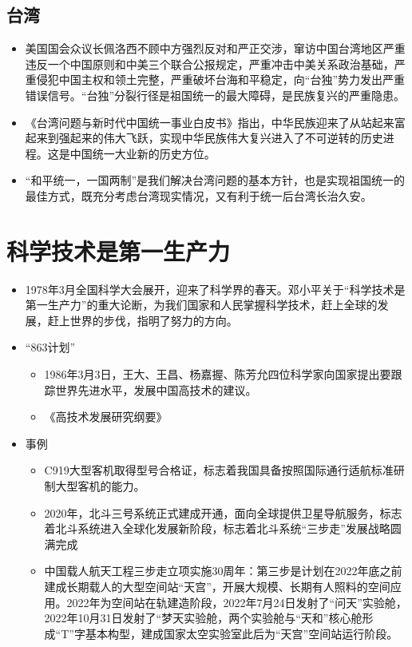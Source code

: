 \documentclass[
]{ctexart}
\providecommand{\tightlist}{%
  \setlength{\itemsep}{0pt}\setlength{\parskip}{0pt}}
\begin{document}
\hypertarget{ux53f0ux6e7e}{%
\subsection{台湾}\label{ux53f0ux6e7e}}

\begin{itemize}
\tightlist
\item
  美国国会众议长佩洛西不顾中方强烈反对和严正交涉，窜访中国台湾地区严重违反一个中国原则和中美三个联合公报规定，严重冲击中美关系政治基础，严重侵犯中国主权和领土完整，严重破坏台海和平稳定，向``台独''势力发出严重错误信号。``台独''分裂行径是祖国统一的最大障碍，是民族复兴的严重隐患。
\item
  《台湾问题与新时代中国统一事业白皮书》指出，中华民族迎来了从站起来富起来到强起来的伟大飞跃，实现中华民族伟大复兴进入了不可逆转的历史进程。这是中国统一大业新的历史方位。
\item
  ``和平统一，一国两制''是我们解决台湾问题的基本方针，也是实现祖国统一的最佳方式，既充分考虑台湾现实情况，又有利于统一后台湾长治久安。
\end{itemize}

\hypertarget{ux79d1ux5b66ux6280ux672fux662fux7b2cux4e00ux751fux4ea7ux529b}{%
\section{科学技术是第一生产力}\label{ux79d1ux5b66ux6280ux672fux662fux7b2cux4e00ux751fux4ea7ux529b}}

\begin{itemize}
\tightlist
\item
  1978年3月全国科学大会展开，迎来了科学界的春天。邓小平关于``科学技术是第一生产力''的重大论断，为我们国家和人民掌握科学技术，赶上全球的发展，赶上世界的步伐，指明了努力的方向。
\item
  ``863计划''

  \begin{itemize}
  \tightlist
  \item
    1986年3月3日，王大、王昌、杨嘉握、陈芳允四位科学家向国家提出要跟踪世界先进水平，发展中国高技术的建议。
  \item
    《高技术发展研究纲要》
  \end{itemize}
\item
  事例

  \begin{itemize}
  \tightlist
  \item
    C919大型客机取得型号合格证，标志着我国具备按照国际通行适航标准研制大型客机的能力。
  \item
    2020年，北斗三号系统正式建成开通，面向全球提供卫星导航服务，标志着北斗系统进入全球化发展新阶段，标志着北斗系统``三步走''发展战略圆满完成
  \item
    中国载人航天工程三步走立项实施30周年：第三步是计划在2022年底之前建成长期载人的大型空间站``天宫''，开展大规模、长期有人照料的空间应用。2022年为空间站在轨建造阶段，2022年7月24日发射了``问天''实验舱，2022年10月31日发射了``梦天实验舱，两个实验舱与``天和''核心舱形成``T''字基本构型，建成国家太空实验室此后为``天宫''空间站运行阶段。
  \end{itemize}
\end{itemize}
\end{document}
